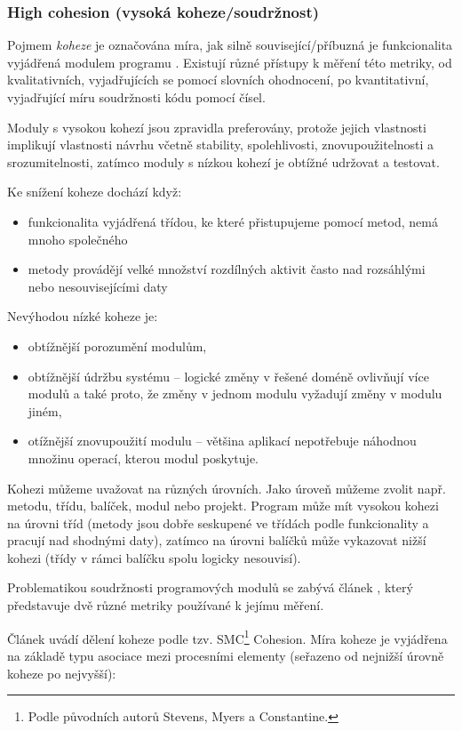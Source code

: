 \subsubsection{High cohesion (vysoká koheze/soudržnost)}
Pojmem \emph{koheze} je označována míra, jak silně související/příbuzná je funkcionalita vyjádřená modulem programu \cite{wiki:cohesion}. Existují různé přístupy k měření této metriky, od kvalitativních, vyjadřujících se pomocí slovních ohodnocení, po kvantitativní, vyjadřující míru soudržnosti kódu pomocí čísel.

Moduly s vysokou kohezí jsou zpravidla preferovány, protože jejich vlastnosti implikují  vlastnosti návrhu včetně stability, spolehlivosti, znovupoužitelnosti a srozumitelnosti, zatímco moduly s nízkou kohezí je obtížné udržovat a testovat.

Ke snížení koheze dochází když:
\begin{itemize}
\item funkcionalita vyjádřená třídou, ke které přistupujeme pomocí metod, nemá mnoho společného
\item metody provádějí velké množství rozdílných aktivit často nad rozsáhlými nebo nesouvisejícími daty
\end{itemize}

Nevýhodou nízké koheze je:
\begin{itemize}
\item obtížnější porozumění modulům,
\item obtížnější údržbu systému -- logické změny v řešené doméně ovlivňují více modulů a také proto, že změny v jednom modulu vyžadují změny v modulu jiném,
\item otížnější znovupoužití modulu -- většina aplikací nepotřebuje náhodnou množinu operací, kterou modul poskytuje.
\end{itemize}

Kohezi můžeme uvažovat na různých úrovních. Jako úroveň můžeme zvolit např. metodu, třídu, balíček, modul nebo projekt. Program může mít vysokou kohezi na úrovni tříd (metody jsou dobře seskupené ve třídách podle funkcionality a pracují nad shodnými daty), zatímco na úrovni balíčků může vykazovat nižší kohezi (třídy v rámci balíčku spolu logicky nesouvisí).

Problematikou soudržnosti programových modulů se zabývá článek \cite{Kang:1996:DCM:872750.873361}, který představuje dvě různé metriky používané k jejímu měření.

Článek \cite{ISI:000079726000029} uvádí dělení koheze podle tzv. SMC\footnote{Podle původních autorů Stevens, Myers a Constantine.} Cohesion. Míra koheze je vyjádřena na základě typu asociace mezi procesními elementy (seřazeno od nejnižší úrovně koheze po nejvyšší):

